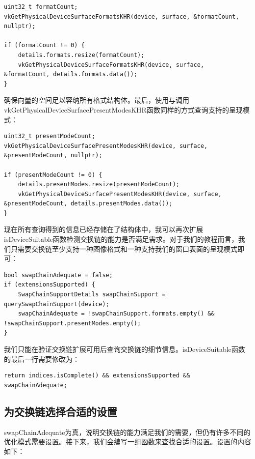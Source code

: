 \documentclass{ctexart}
\begin{document}
\begin{lstlisting}[language={[ANSI]C}]
uint32_t formatCount;
vkGetPhysicalDeviceSurfaceFormatsKHR(device, surface, &formatCount, nullptr);

if (formatCount != 0) {
	details.formats.resize(formatCount);
	vkGetPhysicalDeviceSurfaceFormatsKHR(device, surface, &formatCount, details.formats.data());
}
\end{lstlisting}

确保向量的空间足以容纳所有格式结构体。最后，使用与调用vkGetPhysicalDeviceSurfacePresentModesKHR函数同样的方式查询支持的呈现模式：

\begin{lstlisting}[language={[ANSI]C}]
uint32_t presentModeCount;
vkGetPhysicalDeviceSurfacePresentModesKHR(device, surface, &presentModeCount, nullptr);

if (presentModeCount != 0) {
	details.presentModes.resize(presentModeCount);
	vkGetPhysicalDeviceSurfacePresentModesKHR(device, surface, &presentModeCount, details.presentModes.data());
}
\end{lstlisting}

现在所有查询得到的信息已经存储在了结构体中，我可以再次扩展isDeviceSuitable函数检测交换链的能力是否满足需求。对于我们的教程而言，我们只需要交换链至少支持一种图像格式和一种支持我们的窗口表面的呈现模式即可：

\begin{lstlisting}[language={[ANSI]C}]
bool swapChainAdequate = false;
if (extensionsSupported) {
	SwapChainSupportDetails swapChainSupport = querySwapChainSupport(device);
	swapChainAdequate = !swapChainSupport.formats.empty() && !swapChainSupport.presentModes.empty();
}
\end{lstlisting}

我们只能在验证交换链扩展可用后查询交换链的细节信息。isDeviceSuitable函数的最后一行需要修改为：

\begin{lstlisting}[language={[ANSI]C}]
return indices.isComplete() && extensionsSupported && swapChainAdequate;
\end{lstlisting}

\subsection{为交换链选择合适的设置}

swapChainAdequate为真，说明交换链的能力满足我们的需要，但仍有许多不同的优化模式需要设置。接下来，我们会编写一组函数来查找合适的设置。设置的内容如下：
\end{document}
